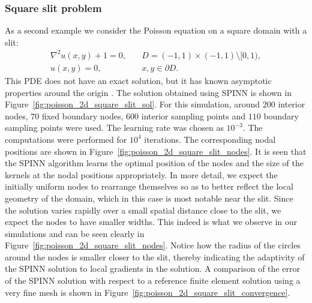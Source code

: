 \documentclass[12pt]{article}
\newcommand{\rb}[1]{#1}
\begin{document}
\subsubsection{Square slit problem}
As a second example we consider the Poisson equation on a square domain with a slit:
\begin{equation} \label{eq:square_slit}
\begin{split}
\nabla^2 u(x, y) + 1 = 0, &\quad D = (-1,1)\times(-1,1) \setminus [0,1),\\
u(x,y) = 0, &\quad x, y \in \partial D.
\end{split}
\end{equation}
This PDE does not have an exact solution, but it has known asymptotic properties around the origin \rb{\cite{EYu2018}}. The solution obtained using SPINN is shown in Figure~\ref{fig:poisson_2d_square_slit_sol}. \rb{For this simulation, around $200$ interior nodes, $70$ fixed boundary nodes, $600$ interior sampling points and $110$ boundary sampling points were used. The learning rate was chosen as $10^{-3}$. The computations were performed for $10^4$ iterations.}  The corresponding nodal positions are shown in Figure~\ref{fig:poisson_2d_square_slit_nodes}. It is seen that the SPINN algorithm learns the optimal position of the nodes and the size of the kernels at the nodal positions appropriately. \rb{In more detail, we expect the initially uniform nodes to rearrange themselves so as to better reflect the local geometry of the domain, which in this case is most  notable near the slit. Since the solution varies rapidly over a small spatial distance close to the slit, we expect the nodes to have smaller widths. This indeed is what we observe in our simulations and can be seen clearly in Figure~\ref{fig:poisson_2d_square_slit_nodes}. Notice how the radius of the circles around the nodes is smaller closer to the slit, thereby indicating the adaptivity of the SPINN solution to local gradients in the solution.} A comparison of the error of the SPINN solution with respect to a reference finite element solution using a very fine mesh is shown in Figure~\ref{fig:poisson_2d_square_slit_convergence}.
\end{document}
